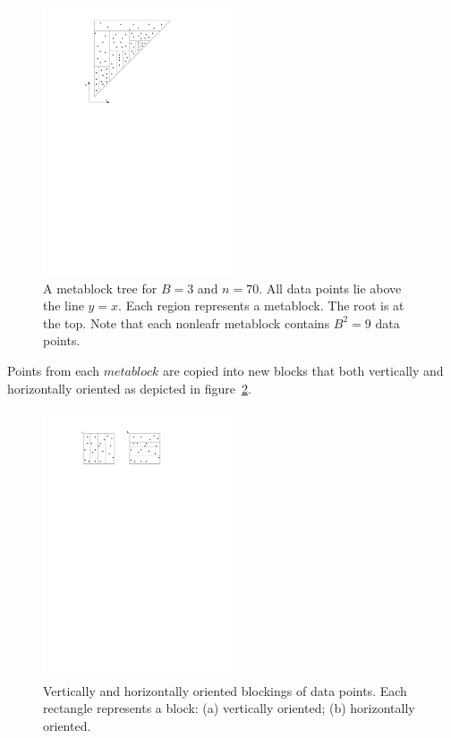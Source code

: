 \documentclass[twoside,11pt,openright]{report}
\begin{document}
\begin{figure}[h]
	\centering
		\includegraphics[width=0.5\textwidth]{../figures/kanellakis_metablock_tree}
	\caption{A metablock tree for $B=3$ and $n=70$. All data points lie above the line $y=x$. Each region represents a metablock. The root is at the top. Note that each nonleafr metablock contains $B^2 = 9$ data points.}
	\label{fig:kanellakis_metablock_tree}
\end{figure}

Points from each $metablock$ are copied into new blocks that both vertically and horizontally oriented as depicted in figure~\ref{fig:kanellakis_vertical_horizontally_oriented_blocks}. 

\begin{figure}[h]
	\centering
		\includegraphics[width=0.5\textwidth]{../figures/kanellakis_vertical_horizontally_oriented_blocks}
	\caption{Vertically and horizontally oriented blockings of data points. Each rectangle represents a block: (a) vertically oriented; (b) horizontally oriented.}
	\label{fig:kanellakis_vertical_horizontally_oriented_blocks}
\end{figure}
\end{document}
